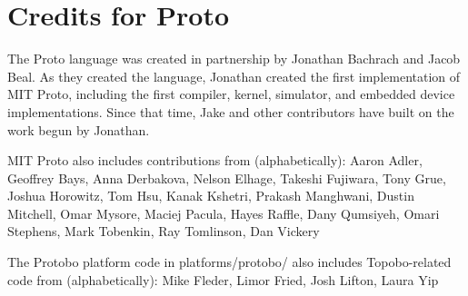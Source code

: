 
\section{Credits for Proto}

The Proto language was created in partnership by Jonathan Bachrach and
Jacob Beal.  As they created the language, Jonathan created the first
implementation of MIT Proto, including the first compiler, kernel,
simulator, and embedded device implementations.  Since that time, Jake
and other contributors have built on the work begun by Jonathan.

MIT Proto also includes contributions from (alphabetically):
%
Aaron Adler, Geoffrey Bays, Anna Derbakova, Nelson Elhage, Takeshi
Fujiwara, Tony Grue, Joshua Horowitz, Tom Hsu, Kanak Kshetri, Prakash
Manghwani, Dustin Mitchell, Omar Mysore, Maciej Pacula, Hayes Raffle,
Dany Qumsiyeh, Omari Stephens, Mark Tobenkin, Ray Tomlinson, Dan
Vickery

The Protobo platform code in platforms/protobo/ also includes 
Topobo-related code from (alphabetically):
%
  Mike Fleder, Limor Fried, Josh Lifton, Laura Yip
